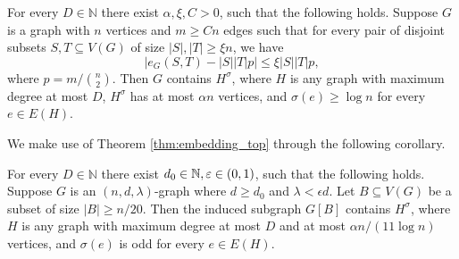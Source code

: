 \documentclass[11pt]{article}
\begin{document}
\begin{theorem} \label{thm:embedding_top}
For every $D \in \mathbb{N}$ there exist $\alpha, \xi, C > 0$, such that the following holds. Suppose $G$ is a graph with $n$ vertices and $m \ge Cn$ edges such that for every pair of disjoint subsets $S, T \subseteq V(G)$ of size $|S|, |T| \ge \xi n$, we have
$$
    \bigl| e_{G}(S, T) - |S||T|p \bigr| \le \xi |S||T| p, 
$$
where $p = m / \binom{n}{2}$. Then $G$ contains $H^{\sigma}$, where $H$ is any graph with maximum degree at most $D$, $H^\sigma$ has at most $\alpha n$ vertices, and $\sigma(e) \ge \log n$ for every $e \in E(H)$.
\end{theorem}

We make use of Theorem \ref{thm:embedding_top} through the following corollary.

\begin{corollary} \label{cor:embedding_top}
  For every $D \in \mathbb{N}$ there exist $d_0 \in \mathbb{N}, \varepsilon \in (0,1)$, such that the following holds. Suppose $G$ is an $(n,d,\lambda)$-graph where $d \ge d_0$ and $\lambda < \epsilon d$. Let $B \subseteq V(G)$ be a subset of size $|B| \ge n/20$. Then the induced subgraph $G[B]$ contains $H^{\sigma}$, where $H$ is any graph with maximum degree at most $D$ and at most $\alpha n / (11 \log n)$ vertices, and $\sigma(e)$ is odd for every $e \in E(H)$.
\end{corollary}
\end{document}
